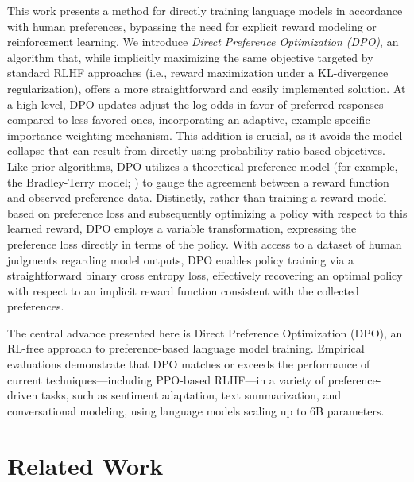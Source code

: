 This work presents a method for directly training language models in accordance with human preferences, bypassing the need for explicit reward modeling or reinforcement learning. We introduce \textit{{Direct Preference Optimization} (DPO)}, an algorithm that, while implicitly maximizing the same objective targeted by standard RLHF approaches (i.e., reward maximization under a KL-divergence regularization), offers a more straightforward and easily implemented solution. At a high level, DPO updates adjust the log odds in favor of preferred responses compared to less favored ones, incorporating an adaptive, example-specific importance weighting mechanism. This addition is crucial, as it avoids the model collapse that can result from directly using probability ratio-based objectives. Like prior algorithms, DPO utilizes a theoretical preference model (for example, the Bradley-Terry model; \cite{bradley1952rankanalysis}) to gauge the agreement between a reward function and observed preference data. Distinctly, rather than training a reward model based on preference loss and subsequently optimizing a policy with respect to this learned reward, DPO employs a variable transformation, expressing the preference loss directly in terms of the policy. With access to a dataset of human judgments regarding model outputs, DPO enables policy training via a straightforward binary cross entropy loss, effectively recovering an optimal policy with respect to an implicit reward function consistent with the collected preferences.

The central advance presented here is Direct Preference Optimization (DPO), an RL-free approach to preference-based language model training. Empirical evaluations demonstrate that DPO matches or exceeds the performance of current techniques—including PPO-based RLHF—in a variety of preference-driven tasks, such as sentiment adaptation, text summarization, and conversational modeling, using language models scaling up to 6B parameters.

\section{Related Work}

